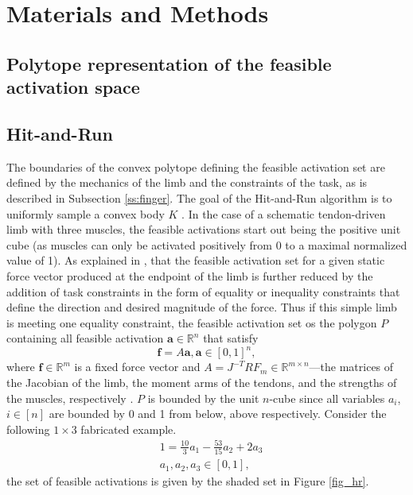 \section{Materials and Methods}

\subsection{Polytope representation of the feasible activation space}



\subsection{Hit-and-Run}
The boundaries of the convex polytope defining the feasible activation set are defined by the mechanics of the limb and the constraints of the task, as is described in Subsection \ref{ss:finger}. The goal of the Hit-and-Run algorithm is to uniformly sample  a convex body $K$ \cite{smith1984efficient}. 
In the case of a schematic tendon-driven limb with three muscles, the feasible activations start out being the positive unit cube (as muscles can only be activated positively from 0 to a maximal normalized value of 1). As explained in \cite{Valero-Cuevas2009mathematical}, that the feasible activation set for a given static force vector produced at the endpoint of the limb is further reduced by the addition of task constraints  in the form of equality or inequality constraints that define the direction and desired magnitude of the force. Thus if this simple limb is meeting one equality constraint, the feasible activation set os the polygon $P$ containing all feasible activation  $\textbf{a} \in \mathbb{R}^n$ that satisfy
\[\textbf{f} = A\textbf{a}, \textbf{a} \in [0,1]^n,\]
where $\textbf{f} \in \mathbb{R}^m$ is a fixed force vector and $A = J^{-T}RF_m \in \mathbb{R}^{m \times n}$---the matrices of the Jacobian of the limb, the moment arms of the tendons, and the strengths of the muscles, respectively \cite{Valero-Cuevas1998Large}. $P$ is bounded by the unit $n$-cube since all variables $a_i$, $i \in [n]$ are bounded by 0 and 1 from below, above respectively.
Consider the following $1 \times 3$ fabricated example.
\begin{align*}
&1 = \frac{10}{3}a_1 - \frac{53}{15}a_2 + 2a_3 \\
&a_1, a_2, a_3 \in [0,1],
\end{align*}
the set of feasible activations is given by the shaded set in Figure \ref{fig_hr}.

